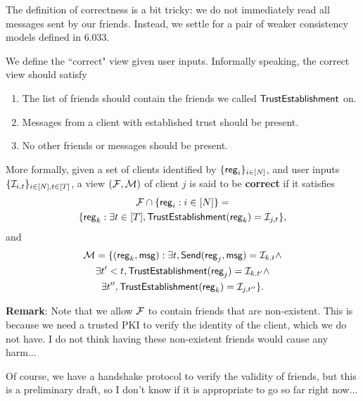 The definition of correctness is a bit tricky: we do not immediately read all messages sent by our friends. Instead, we settle for a pair of weaker consistency models defined in 6.033. %
\begin{definition}
We define the ``correct" view given user inputs. Informally speaking, the correct view should satisfy
\begin{enumerate}
    \item The list of friends should contain the friends we called $\mathsf{TrustEstablishment}$ on.         
    \item Messages from a client with established trust should be present.  
    \item No other friends or messages should be present. 
\end{enumerate}
More formally, given a set of clients identified by $\{\mathsf{reg}_i\}_{i \in [N]}$, and user inputs $\{\mathcal{I}_{i, t}\}_{i \in [N], t \in [T]}$, a view $(\mathcal{F}, \mathcal{M})$ of client $j$ is said to be \textbf{correct} if it satisfies
\begin{multline*}
\mathcal{F} \cap \{\mathsf{reg}_i: i \in [N]\} = 
 \\ \{\mathsf{reg}_k: \exists t \in [T], \mathsf{TrustEstablishment}(\mathsf{reg}_k) = \mathcal{I}_{j, t}\},    
\end{multline*}
and
\begin{multline*}
 \mathcal{M} = \{(\mathsf{reg}_k, \mathsf{msg}): \exists t, \mathsf{Send}(\mathsf{reg}_j, \mathsf{msg}) = \mathcal{I}_{k, t} \land \\
 \exists t' < t, \mathsf{TrustEstablishment}(\mathsf{reg}_j) = \mathcal{I}_{k, t'} \land \\
 \exists t'', \mathsf{TrustEstablishment}(\mathsf{reg}_k) = \mathcal{I}_{j, t''}\} .   
\end{multline*}
\end{definition}
\textbf{Remark}: Note that we allow $\mathcal{F}$ to contain friends that are non-existent. This is because we need a trusted PKI to verify the identity of the client, which we do not have. I do not think having these non-existent friends would cause any harm...

Of course, we have a handshake protocol to verify the validity of friends, but this is a preliminary draft, so I don't know if it is appropriate to go so far right now...

